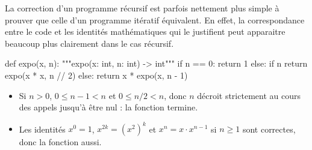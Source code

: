 \documentclass{magnolia}
\begin{document}
La correction d'un programme récursif est parfois nettement plus simple
à prouver que celle d'un programme itératif équivalent. En effet, la
correspondance entre le code et les identités mathématiques qui le
justifient peut apparaitre beaucoup plus clairement dans le cas
récursif.

\begin{pythoncodeline}
def expo(x, n):
    """expo(x: int, n: int) -> int"""
    if n == 0:
        return 1
    else:
        if n %
            return expo(x * x, n // 2)
        else:
            return x * expo(x, n - 1)
\end{pythoncodeline}
  \begin{itemize}
    \item Si $n>0$, $0 \leq n - 1 < n$ et $0 \leq n/2 < n$, donc $n$ décroit
    strictement au cours des appels jusqu'à être nul : la fonction termine.
    \item Les identités $x^0 = 1$, $x^{2k} = (x^2)^k$ et
    $x^n = x\cdot x^{n - 1}$ si $n \geq 1$ sont correctes, donc la
    fonction aussi.
  \end{itemize}
\end{document}
